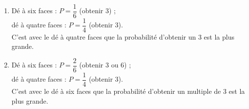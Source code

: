    \ \\ [-5mm]
   \begin{enumerate}
      \item Dé à six faces : $P =\dfrac16$ (obtenir 3) ; \\ [1mm]
      dé à quatre faces : $P =\dfrac14$ (obtenir 3). \\ [1mm]
      C'est avec le {\blue dé à quatre faces} que la probabilité d'obtenir un 3 est la plus grande. \smallskip
      \item Dé à six faces : $ P =\dfrac26$ (obtenir 3 ou 6) ; \\ [1mm]
      dé à quatre faces : $P =\dfrac14$ (obtenir 3). \\ [1mm]
      C'est avec le {\blue dé à six faces} que la probabilité d'obtenir un multiple de 3 est la plus grande.
   \end{enumerate}
